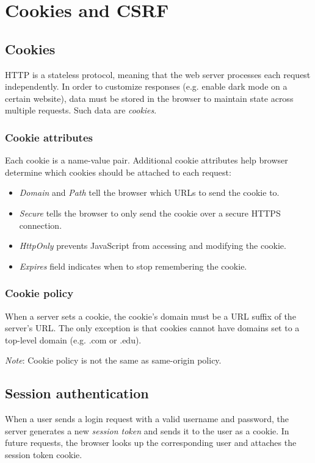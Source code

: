 \chapter{Cookies and CSRF}

\section{Cookies}
HTTP is a stateless protocol, meaning that the web server processes each request independently. In order to customize responses (e.g. enable dark mode on a certain website), data must be stored in the browser to maintain state across multiple requests. Such data are \emph{cookies}.

\subsection{Cookie attributes}
Each cookie is a name-value pair. Additional cookie attributes help browser determine which cookies should be attached to each request:
\begin{itemize}
    \item \emph{Domain} and \emph{Path} tell the browser which URLs to send the cookie to.
    \item \emph{Secure} tells the browser to only send the cookie over a secure HTTPS connection.
    \item \emph{HttpOnly} prevents JavaScript from accessing and modifying the cookie.
    \item \emph{Expires} field indicates when to stop remembering the cookie.
\end{itemize}

\subsection{Cookie policy}
When a server sets a cookie, the cookie's domain must be a URL suffix of the server's URL. The only exception is that cookies cannot have domains set to a top-level domain (e.g. .com or .edu).

\medskip
\emph{Note}: Cookie policy is not the same as same-origin policy.

\section{Session authentication}
When a user sends a login request with a valid username and password, the server generates a new \emph{session token} and sends it to the user as a cookie. In future requests, the browser looks up the corresponding user and attaches the session token cookie.

